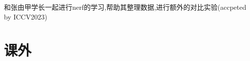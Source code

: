 \documentclass{uniquecv}
\begin{document}
和张由甲学长一起进行nerf的学习,帮助其整理数据,进行额外的对比实验(accpeted by ICCV2023) 


\section{课外}
\end{document}
